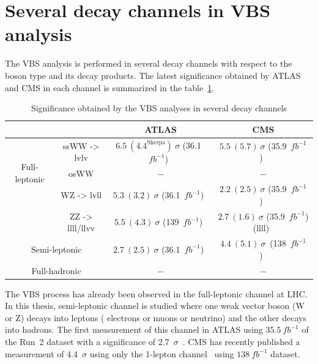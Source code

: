 \section{Several decay channels in VBS analysis}
The VBS analysis is performed in several decay channels with respect to the boson type and its decay products.
The latest significance obtained by ATLAS and CMS in each channel is summarized in the table~\ref{tab:VBSchannels}.


\begin{center}
\begin{table}[h]
\begin{tabular}{|c|c|c|c|}
\hline \multicolumn{2}{|c|}{}                                   & ATLAS                              & CMS\\
\hline
\hline \multirow{3}{*}{ Full-leptonic }      & ssWW -> lvlv     & $6.5~(4.4^{\mathrm{Sherpa}})~\sigma$ (36.1~$fb^{-1}$)~\cite{STDM-2017-06} & $5.5~(5.7)~\sigma$ (35.9~$fb^{-1}$)~\cite{CMS-SMP-21-001}  \\
\cline { 2 - 4 }                             & osWW             & $-$                                 & $-$   \\
\cline { 2 - 4 }                             & WZ -> lvll       & $5.3~(3.2)~\sigma$ (36.1~$fb^{-1}$)~\cite{STDM-2017-23} & $2.2~(2.5)~\sigma$ (35.9~$fb^{-1}$)~\cite{CMS-SMP-18-001}   \\
\cline { 2 - 4 }                             & ZZ -> llll/llvv  & $5.5~(4.3)~\sigma$ (139~$fb^{-1}$)~\cite{STDM-2017-19}  & $2.7~(1.6)~\sigma$ (35.9~$fb^{-1}$) (llll)~\cite{CMS-SMP-17-006} \\
\hline \multicolumn{2}{|c|}{ Semi-leptonic }                    & $2.7~(2.5)~\sigma$ (36.1~$fb^{-1}$)~\cite{STDM-2017-20} & $4.4~(5.1)~\sigma$~(138~$fb^{-1}$)~\cite{CMS-SMP-20-013}  \\
\hline \multicolumn{2}{|c|}{ Full-hadronic }                    & $-$                                & $-$  \\
\hline
\end{tabular}
\caption{Significance obtained by the VBS analyses in several decay channels}
\label{tab:VBSchannels}
\end{table}
\end{center}
The VBS process has already been observed in the full-leptonic channel at LHC.
In this thesis, semi-leptonic channel is studied where one weak vector boson (W or Z) decays into leptons ( electrons or muons or neutrino) and the other decays into hadrons.
The first measurement of this channel in ATLAS using $35.5~fb^{-1}$ of the Run~2 dataset with a significance of 2.7~$\sigma$~\cite{STDM-2017-20}. 
CMS has recently published a measurement of 4.4~$\sigma$ using only the 1-lepton channel~\cite{CMS-SMP-20-013} using  $138~fb^{-1}$ dataset.

